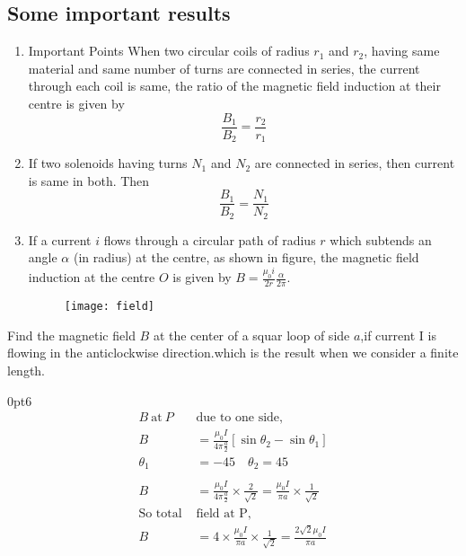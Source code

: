 \subsection{Some important results}
\begin{enumerate}
	\item Important Points
	When two circular coils of radius $r_{1}$ and $r_{2}$, having same material and same number of turns are connected in series, the current through each coil is same, the ratio of the magnetic field induction at their centre is given by
	$$
	\frac{B_{1}}{B_{2}}=\frac{r_{2}}{r_{1}}
	$$
	\item If two solenoids having turns $N_{1}$ and $N_{2}$ are connected in series, then current is same in both. Then
	$$
	\frac{B_{1}}{B_{2}}=\frac{N_{1}}{N_{2}}
	$$
	\item If a current $i$ flows through a circular path of radius $r$ which subtends an angle $\alpha$ (in radius) at the centre, as shown in figure, the magnetic field induction at the centre $O$ is given by $B=\frac{\mu_{0}i}{2r} \frac{\alpha }{2\pi}$.
		\begin{figure}[H]
		\begin{center}
			\texttt{[image: field]}
		\end{center}
	\end{figure}
\end{enumerate}
\begin{exercise}
	Find the magnetic field $B$ at the center of a squar loop of side $a$,if current I is flowing in the anticlockwise direction.which is the result when we consider a finite length.
\end{exercise}
\opencutright
\renewcommand\windowpagestuff{
	\centering\texttt{[image: diagram-20210417(9)-crop]}}
\begin{answer}
	\vspace{1cm}
	\begin{cutout}{3}{\dimexpr\linewidth-6cm\relax}{0pt}{6}
		\begin{align*}
		B\ \text{at}\  P\ &\text{due to one side,}\\
		B&=\frac{\mu_0I}{4\pi \frac{a}{2}}[\sin\theta_2-\sin\theta_1]\\
		\theta_1&=-45 \quad \theta_2=45\\\\
		B&=\frac{\mu_0I}{4\pi \frac{a}{2}}\times\frac{2}{\sqrt{2}}=\frac{\mu_0I}{\pi a}\times\frac{1}{\sqrt{2}}\\
		\text{So total }&\text{field at P,}\\
		B&= 4\times\frac{\mu_0I}{\pi a} \times \frac{1}{\sqrt{2}}=\frac{2\sqrt{2}\mu_0I}{\pi a}
		\end{align*}
	\end{cutout}
\end{answer}


